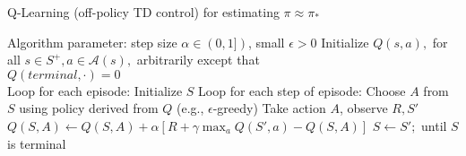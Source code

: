 \begin{algorithm}
    \caption{Q-Learning (off-policy TD control) for estimating $\pi \approx \pi_*$}
    \begin{algorithmic}[1]
        \State Algorithm parameter: step size $\alpha \in (0,1])$, small $\epsilon > 0$
        \State Initialize $Q(s,a),$ for all $s \in S^+, a \in \mathcal{A}(s),$ arbitrarily except that \\ $Q(terminal, \mathord{\cdot}) = 0$
        \\
        \State Loop for each episode:
        \Indent
            \State Initialize $S$
            \State Loop for each step of episode:
            \Indent
                \State Choose $A$ from $S$ using policy derived from $Q$ (e.g., $\epsilon$-greedy)
                \State Take action $A$, observe $R, S'$
                \State $Q(S,A) \gets Q(S,A) + \alpha [R + \gamma \max_a Q(S',a) - Q(S,A)]$
                \State $S \gets S';$
            \EndIndent
            \State until $S$ is terminal
        \EndIndent 
    \end{algorithmic}
\end{algorithm}